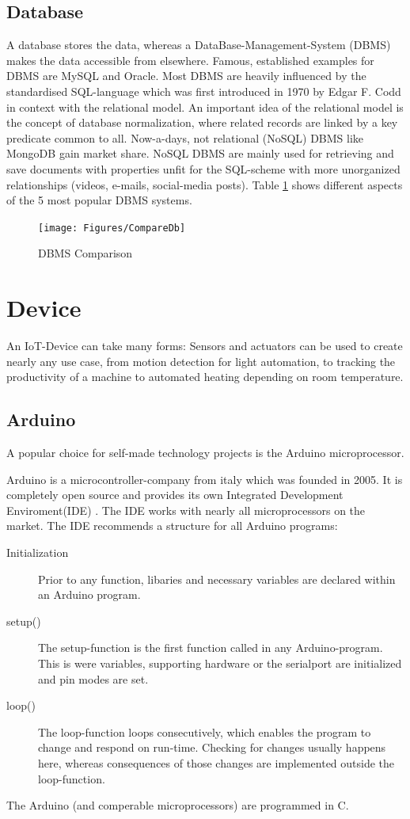 \subsection{Database}
A database stores the data, whereas a DataBase-Management-System (DBMS) makes the data accessible from elsewhere.
Famous, established examples for DBMS are MySQL and Oracle.
Most DBMS are heavily influenced by the standardised SQL-language which was first introduced in 1970 by Edgar F. Codd in context with the relational model.
An important idea of the relational model is the concept of database normalization, where related records are linked by a key predicate common to all.
Now-a-days, not relational (NoSQL) DBMS like MongoDB gain market share. 
NoSQL DBMS are mainly used for retrieving and save documents with properties unfit for the SQL-scheme with more unorganized relationships (videos, e-mails, social-media posts).
Table \ref{fig:CompareDb} shows different aspects of the 5 most popular DBMS systems.

\begin{figure}[b]
	\centering
    \texttt{[image: Figures/CompareDb]}
	\decoRule
	\caption[DBMS Comparison]{DBMS Comparison}
	\label{fig:CompareDb}
\end{figure}

\section{Device}
An IoT-Device can take many forms: 
Sensors and actuators can be used to create nearly any use case, 
from motion detection for light automation, to tracking the productivity of a machine to automated heating depending on room temperature.

\subsection{Arduino}
A popular choice for self-made technology projects is the Arduino microprocessor.

Arduino is a microcontroller-company from italy which was founded in 2005. 
It is completely open source and provides its own Integrated Development Enviroment(IDE) \parencite{arduinoIDEDownload}.
The IDE works with nearly all microprocessors on the market. 
The IDE recommends a structure for all Arduino programs:
\begin{description}
    \item [Initialization]
    Prior to any function, libaries and necessary variables are declared within an Arduino program.
    \item [setup()]
    The setup-function is the first function called in any Arduino-program. 
    This is were variables, supporting hardware or the serialport are initialized and pin modes are set. 
    \item [loop()]
    The loop-function loops consecutively, 
    which enables the program to change and respond on run-time.
    Checking for changes usually happens here, 
    whereas consequences of those changes are implemented outside the loop-function.    
\end{description}
The Arduino (and comperable microprocessors) are programmed in C.

